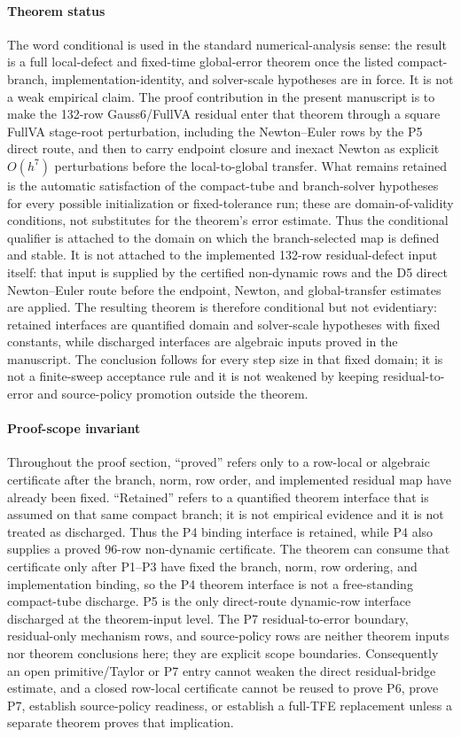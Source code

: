 \documentclass[preprint,12pt]{elsarticle}
\newcommand{\method}{Gauss6\slash FullVA}
\newcommand{\tfe}{TFE}
\begin{document}
\paragraph{Theorem status}
The word conditional is used in the standard numerical-analysis sense: the
result is a full local-defect and fixed-time global-error theorem once the
listed compact-branch, implementation-identity, and solver-scale hypotheses
are in force. It is not a weak empirical claim. The proof contribution in the
present manuscript is to make the 132-row \method{} residual enter that
theorem through a square FullVA stage-root perturbation, including the
Newton--Euler rows by the P5 direct route, and then to carry endpoint closure
and inexact Newton as explicit \(O(h^7)\) perturbations before the
local-to-global transfer. What remains retained is the automatic satisfaction
of the compact-tube and branch-solver hypotheses for every possible
initialization or fixed-tolerance run; these are domain-of-validity
conditions, not substitutes for the theorem's error estimate.
Thus the conditional qualifier is attached to the domain on which the
branch-selected map is defined and stable.  It is not attached to the
implemented 132-row residual-defect input itself: that input is supplied by
the certified non-dynamic rows and the D5 direct Newton--Euler route before
the endpoint, Newton, and global-transfer estimates are applied.
The resulting theorem is therefore conditional but not evidentiary: retained
interfaces are quantified domain and solver-scale hypotheses with fixed
constants, while discharged interfaces are algebraic inputs proved in the
manuscript.  The conclusion follows for every step size in that fixed domain;
it is not a finite-sweep acceptance rule and it is not weakened by keeping
residual-to-error and source-policy promotion outside the theorem.

\paragraph{Proof-scope invariant}
Throughout the proof section, ``proved'' refers only to a row-local or
algebraic certificate after the branch, norm, row order, and implemented
residual map have already been fixed.  ``Retained'' refers to a quantified
theorem interface that is assumed on that same compact branch; it is not
empirical evidence and it is not treated as discharged.  Thus the P4 binding
interface is retained, while P4 also supplies a proved 96-row non-dynamic
certificate.  The theorem can consume that certificate only after P1--P3 have
fixed the branch, norm, row ordering, and implementation binding, so the P4
theorem interface is not a free-standing
compact-tube discharge.  P5 is the only direct-route dynamic-row interface
discharged at the theorem-input level.  The P7 residual-to-error boundary,
residual-only mechanism rows, and
source-policy rows are neither theorem inputs nor theorem conclusions here;
they are explicit scope boundaries.  Consequently an open primitive/Taylor or
P7 entry cannot weaken the direct residual-bridge estimate, and a closed row-local
certificate cannot be reused to prove P6, prove P7, establish source-policy
readiness, or establish a full-\tfe{} replacement unless a separate theorem
proves that implication.
\end{document}
